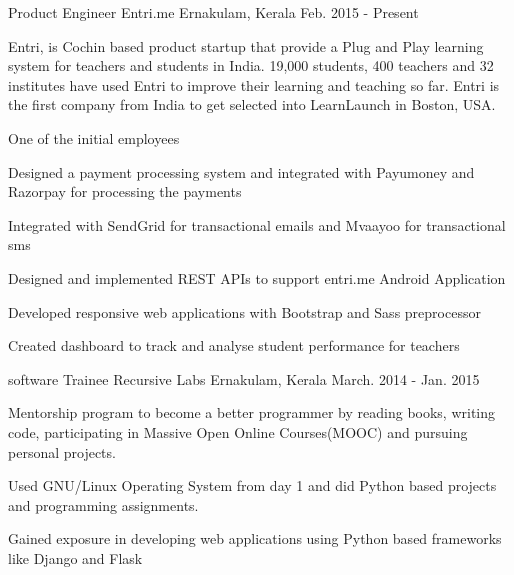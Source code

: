 

\begin{cventries}

  \cventry
    {Product Engineer} %
    {Entri.me} %
    {Ernakulam, Kerala} %
    {Feb. 2015 - Present} %
    {\begin{cvparagraph} %
       Entri, is Cochin based product startup that provide a Plug and Play learning system for teachers and students in India. 19,000 students, 400 teachers and 32 institutes have used Entri to improve their learning and teaching so far. Entri is the first company from India to get selected into LearnLaunch in Boston, USA.
\end{cvparagraph}
}
    {
      \begin{cvitems} %
        \item {One of the initial employees}
        \item {Designed a payment processing system and integrated with Payumoney and Razorpay for processing the payments}
        \item{Integrated with SendGrid for transactional emails and Mvaayoo for transactional sms}
        \item{Designed and implemented REST APIs to support entri.me Android Application}
        \item{Developed responsive web applications with Bootstrap and Sass preprocessor}
        \item{Created dashboard to track and analyse student performance for teachers}
      \end{cvitems}
    }

  \cventry
    {software Trainee} %
    {Recursive Labs} %
    {Ernakulam, Kerala} %
    {March. 2014 - Jan. 2015} %
    {\begin{cvparagraph} %
       Mentorship program to become a better programmer by reading books, writing code, participating in Massive Open Online Courses(MOOC) and pursuing personal projects.
\end{cvparagraph}
}
    {
      \begin{cvitems} %
        \item {Used GNU/Linux Operating System from day 1 and did Python based projects and programming assignments.}
        \item {Gained exposure in developing web applications using Python based frameworks like Django and Flask}
      \end{cvitems}
    }

\end{cventries}
